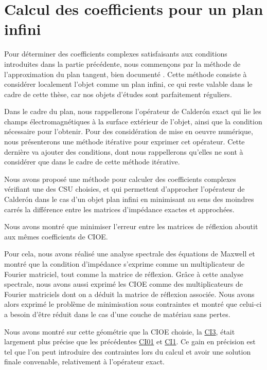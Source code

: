 \chapter{Calcul des coefficients pour un plan infini}
\label{sec:plan}
\minitoc
\newpage

Pour déterminer des coefficients complexes satisfaisants aux conditions introduites dans la partie précédente, nous commençons par la méthode de l'approximation du plan tangent, bien documenté \cite{hoppe_impedance_1995,marceaux_high-order_2000,aubakirov_electromagnetic_2014}. Cette méthode consiste à considérer localement l'objet comme un plan infini, ce qui reste valable dans le cadre de cette thèse, car nos objets d'études sont parfaitement réguliers.

Dans le cadre du plan, nous rappellerons l'opérateur de Calderón exact qui lie les champs électromagnétiques à la surface extérieur de l’objet, ainsi que la condition nécessaire pour l'obtenir.
Pour des considération de mise en oeuvre numérique, nous présenterons une méthode itérative pour exprimer cet opérateur.
Cette dernière va ajouter des conditions, dont nous rappellerons qu'elles ne sont à considérer que dans le cadre de cette méthode itérative.








Nous avons proposé une méthode pour calculer des coefficients complexes vérifiant une des CSU choisies, et qui permettent d'approcher l'opérateur de Calderón dans le cas d'un objet plan infini en minimisant au sens des moindres carrés la différence entre les matrices d'impédance exactes et approchées.

Nous avons montré que minimiser l'erreur entre les matrices de réflexion aboutit aux mêmes coefficients de CIOE.

Pour cela, nous avons réalisé une analyse spectrale des équations de Maxwell et montré que la condition d'impédance s'exprime comme un multiplicateur de Fourier matriciel, tout comme la matrice de réflexion. Grâce à cette analyse spectrale, nous avons aussi exprimé les CIOE comme des multiplicateurs de Fourier matriciels dont on a déduit la matrice de réflexion associée. Nous avons alors exprimé le problème de minimisation sous contraintes et montré que celui-ci a besoin d'être réduit dans le cas d'une couche de matériau sans pertes.

Nous avons montré sur cette géométrie que la CIOE choisie, la \hyperlink{ci3}{CI3}, était largement plus précise que les précédentes \hyperlink{ci01}{CI01} et \hyperlink{ci1}{CI1}. Ce gain en précision est tel que l'on peut introduire des contraintes lors du calcul et avoir une solution finale convenable, relativement à l'opérateur exact.
